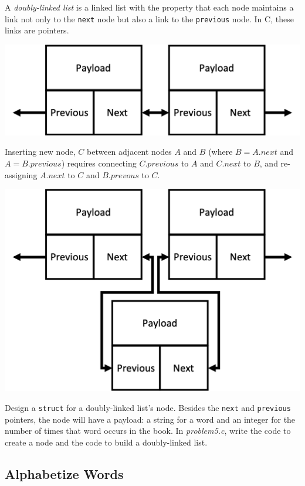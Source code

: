 A \textit{doubly-linked list} is a linked list with the property that each node
maintains a link not only to the \lstinline{next} node but also a link to the
\lstinline{previous} node. In C, these links are pointers.
\begin{center}
\includegraphics[scale=0.5]{doubly-linked-list}
\end{center}
Inserting new node, $C$ between adjacent nodes $A$ and $B$ (where $B = A.next$
and $A = B.previous$) requires connecting $C.previous$ to $A$ and $C.next$ to
$B$, and re-assigning $A.next$ to $C$ and $B.prevous$ to $C$.
\begin{center}
\includegraphics[scale=0.5]{list-insertion}
\end{center}

Design a \lstinline{struct} for a doubly-linked list's node. Besides the
\lstinline{next} and \lstinline{previous} pointers, the node will have a
payload: a string for a word and an integer for the number of times that word
occurs in the book. In \textit{problem5.c}, write the code to create a node
and the code to build a doubly-linked list.

\subsection{Alphabetize Words}

